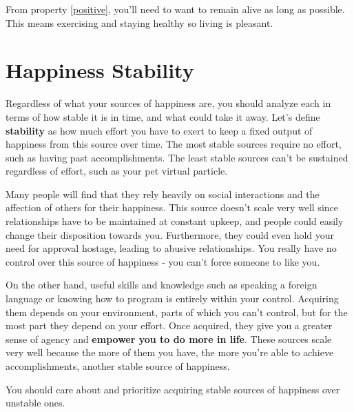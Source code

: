 \documentclass{report}
\begin{document}
From property \ref{positive}, you'll need to want to remain alive as long as
possible. This means exercising and staying healthy so living is pleasant. 

\section{Happiness Stability}
Regardless of what your sources of happiness are, you should analyze
each in terms of how stable it is in time, and what could take it away.
Let's define \textbf{stability} as how much effort you have to exert to
keep a fixed output of happiness from this source over time. 
The most stable sources require no effort, such as having past accomplishments. 
The least stable sources can't be sustained regardless of effort,
such as your pet virtual particle.

Many people will find that they rely heavily on social interactions and the
affection of others for their happiness. This source doesn't scale very well 
since relationships have to be maintained at constant upkeep, 
and people could easily change their disposition towards you.
Furthermore, they could even hold your need for approval hostage, leading to
abusive relationships. You really have no control over this source of happiness
- you can't force someone to like you.


On the other hand, useful skills and knowledge such as speaking a 
foreign language or knowing how to program is entirely within your control.
Acquiring them depends on your environment, parts of which you can't control,
but for the most part they depend on your effort. Once acquired, they give
you a greater sense of agency and \textbf{empower you to do more in life}.
These sources scale very well because the more of them you have, the more
you're able to achieve accomplishments, another stable source of happiness.

You should care about and prioritize acquiring stable sources of happiness over
unstable ones.
\end{document}
